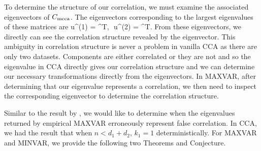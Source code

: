 To determine the structure of our correlation, we must examine the associated eigenvectors
of $C_{\text{mcca}}$. The eigenvectors corresponding to the largest eigenvalues of these matrices
are
\be
u^{(1)} = \left[1, 1, 0\right]^T,\,\,\,\,u^{(2)} = \left[1,1,1\right]^T.
\ee
From these eigenvectors, we directly can see the correlation structure revealed by the
eigenvector. This ambiguity in correlation structure is never a problem in vanilla CCA as
there are only two datasets. Components are either correlated or they are not and so the
eigenvalue in CCA directly gives our correlation structure and we can determine our
necessary transformations directly from the eigenvectors. In MAXVAR, after determining
that our eigenvalue represents a correlation, we then need to inspect the corresponding
eigenvector to determine the correlation structure.

Similar to the result by \cite{pezeshki2004empirical}, we would like to determine when the eigenvalues
returned by empirical MAXVAR erroneously represent false correlation. In CCA, we had the
result that when $n<d_1+d_2$, $k_1=1$ deterministically. For MAXVAR and MINVAR, we provide
the following two Theorems and Conjecture.

